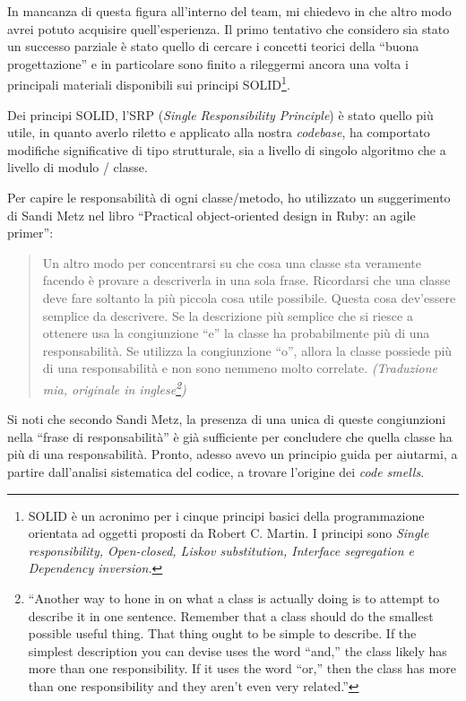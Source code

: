 \documentclass[12pt]{report}
\begin{document}
In mancanza di questa figura all'interno del team, mi chiedevo in che altro modo 
avrei potuto acquisire quell'esperienza. Il primo tentativo 
che considero sia stato un successo parziale è stato quello di 
cercare i concetti teorici della ``buona progettazione'' 
e in particolare sono finito a rileggermi ancora una volta 
i principali materiali disponibili sui principi SOLID\footnote{
SOLID è un acronimo per i cinque principi basici della programmazione
orientata ad oggetti proposti da Robert C. Martin. I principi sono \textit{
Single
responsibility, Open-closed, Liskov substitution, 
Interface segregation e Dependency inversion.
}
}. 

Dei principi SOLID, l'SRP (\textit{Single Responsibility Principle})
è stato quello più utile, in quanto averlo riletto e applicato alla 
nostra \textit{codebase}, ha comportato 
modifiche significative di tipo strutturale, sia a livello di singolo 
algoritmo che a livello di modulo / classe.

Per capire le responsabilità di ogni classe/metodo, ho utilizzato un
suggerimento di Sandi Metz nel libro ``Practical object-oriented 
design in Ruby: an agile primer'':

\begin{quote}
Un altro modo per concentrarsi su che cosa una classe sta veramente facendo
è provare a descriverla in una sola frase. Ricordarsi che una classe deve
fare soltanto la più piccola cosa utile possibile. Questa cosa dev'essere
semplice da descrivere. Se la descrizione più semplice che si riesce a
ottenere usa la congiunzione ``e'' la classe ha probabilmente più di una
responsabilità. Se utilizza la congiunzione ``o'', allora la classe
possiede più di una responsabilità e non sono nemmeno molto correlate. \cite{metz2013}
\flushright
\textit{(Traduzione mia, originale in inglese\footnote{
``Another way to hone in on what a class is actually doing is to attempt 
to describe it in one sentence. Remember that a class should do 
the smallest possible useful thing. That thing ought to be simple 
to describe. If the simplest description you can devise uses the word ``and,'' 
the class likely has more than one responsibility. If it uses the word ``or,'' 
then the class has more than one responsibility and they aren’t 
even very related.''})
}
\end{quote}

Si noti che secondo Sandi Metz, la presenza di
una unica di queste congiunzioni nella ``frase di responsabilità''
è già sufficiente per concludere che
quella classe ha più di una responsabilità. Pronto, adesso avevo un
principio guida per aiutarmi, a partire dall'analisi sistematica del codice,
a trovare l'origine dei \textit{code smells}.
\end{document}
